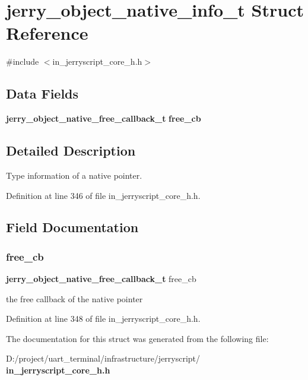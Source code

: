 \section{jerry\+\_\+object\+\_\+native\+\_\+info\+\_\+t Struct Reference}
\label{structjerry__object__native__info__t}


{\ttfamily \#include $<$in\+\_\+jerryscript\+\_\+core\+\_\+h.\+h$>$}

\subsection*{Data Fields}
\begin{DoxyCompactItemize}
\item 
\textbf{ jerry\+\_\+object\+\_\+native\+\_\+free\+\_\+callback\+\_\+t} \textbf{ free\+\_\+cb}
\end{DoxyCompactItemize}


\subsection{Detailed Description}
Type information of a native pointer. 

Definition at line 346 of file in\+\_\+jerryscript\+\_\+core\+\_\+h.\+h.



\subsection{Field Documentation}
\mbox{\label{structjerry__object__native__info__t_a7fbe39d4c8671f35743654c28972ba0b}} 
\subsubsection{free\_cb}
{\footnotesize\ttfamily \textbf{ jerry\+\_\+object\+\_\+native\+\_\+free\+\_\+callback\+\_\+t} free\+\_\+cb}

the free callback of the native pointer 

Definition at line 348 of file in\+\_\+jerryscript\+\_\+core\+\_\+h.\+h.



The documentation for this struct was generated from the following file\+:\begin{DoxyCompactItemize}
\item 
D\+:/project/uart\+\_\+terminal/infrastructure/jerryscript/\textbf{ in\+\_\+jerryscript\+\_\+core\+\_\+h.\+h}\end{DoxyCompactItemize}
